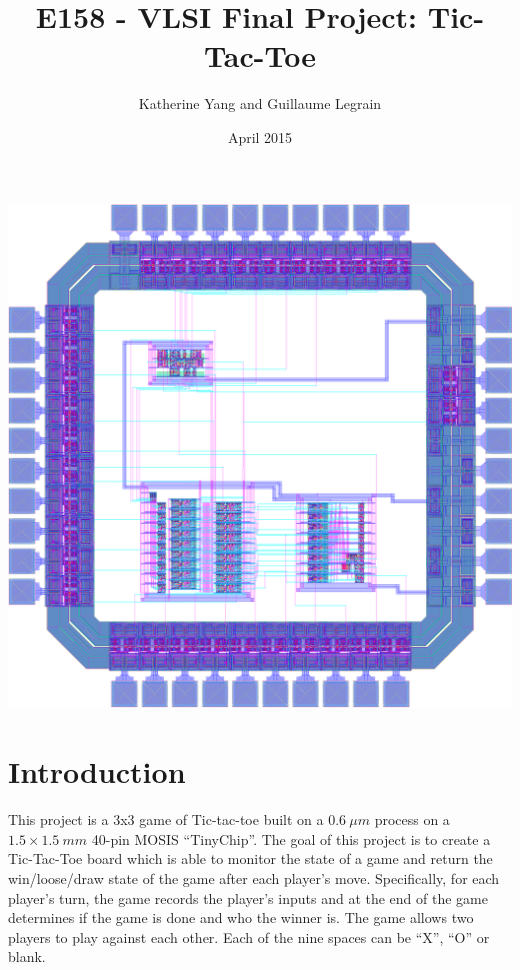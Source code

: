 \documentclass[]{article}
\title{E158 - VLSI Final Project: Tic-Tac-Toe}
\author{Katherine Yang and Guillaume Legrain}
\date{April 2015}
\begin{document}
\maketitle
{\centering
\includegraphics[scale=0.15]{chip-layout} \par
}

\clearpage

\section{Introduction}
\label{sec:introduction}
This project is a 3x3 game of Tic-tac-toe built on a $0.6~\mu m$ process on a $1.5 \times 1.5~mm$ 40-pin MOSIS ``TinyChip''. The goal of this project is to create a Tic-Tac-Toe board which is able to monitor the state of a game and return the win/loose/draw state of the game after each player's move. Specifically, for each player's turn, the game records the player's inputs and at the end of the game determines if the game is done and who the winner is. The game allows two players to play against each other. Each of the nine spaces can be ``X'', ``O'' or blank. 
\end{document}
